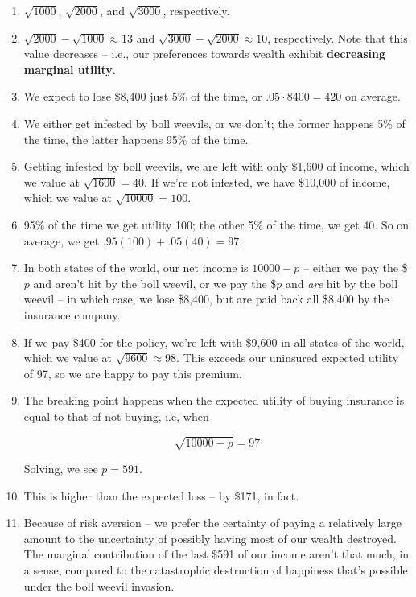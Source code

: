 \documentclass{article}
\newenvironment{solution}{\color{red}}{\color{black}}
\begin{document}
\begin{solution}
\begin{enumerate}
\item $\sqrt{1000}$, $\sqrt{2000}$, and $\sqrt{3000}$, respectively.
\item $\sqrt{2000} - \sqrt{1000} \approx 13$ and $\sqrt{3000} - \sqrt{2000} \approx 10$, respectively. Note that this value decreases -- i.e., our preferences towards wealth exhibit \textbf{decreasing marginal utility}.
\item We expect to lose \$8,400 just 5\% of the time, or $.05\cdot 8400 = 420$ on average.
\item We either get infested by boll weevils, or we don't; the former happens 5\% of the time, the latter happens 95\% of the time.
\item Getting infested by boll weevils, we are left with only \$1,600 of income, which we value at $\sqrt{1600} = 40$. If we're not infested, we have \$10,000 of income, which we value at $\sqrt{10000} = 100$.
\item 95\% of the time we get utility 100; the other 5\% of the time, we get 40. So on average, we get $.95(100) + .05(40) = 97$.
\item In both states of the world, our net income is $10000 - p$ -- either we pay the \$$p$ and aren't hit by the boll weevil, or we pay the \$$p$ and \textit{are} hit by the boll weevil -- in which case, we lose \$8,400, but are paid back all \$8,400 by the insurance company.
\item If we pay \$400 for the policy, we're left with \$9,600 in all states of the world, which we value at $\sqrt{9600} \approx 98$. This exceeds our uninsured expected utility of 97, so we are happy to pay this premium.
\item The breaking point happens when the expected utility of buying insurance is equal to that of not buying, i.e, when

\[ \sqrt{10000 - p} = 97 \]

Solving, we see $p = 591$.
\item This is higher than the expected loss -- by \$171, in fact.
\item Because of risk aversion -- we prefer the certainty of paying a relatively large amount to the uncertainty of possibly having most of our wealth destroyed. The marginal contribution of the last \$591 of our income aren't that much, in a sense, compared to the catastrophic destruction of happiness that's possible under the boll weevil invasion.
\end{enumerate}
\end{solution}
\end{document}
